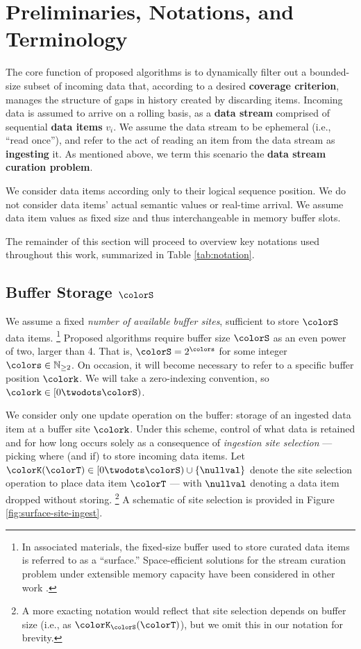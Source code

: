 \section{Preliminaries, Notations, and Terminology} \label{sec:notation}

The core function of proposed algorithms is to dynamically filter out a bounded-size subset of incoming data that, according to a desired \textbf{coverage criterion}, manages the structure of gaps in history created by discarding items.
Incoming data is assumed to arrive on a rolling basis, as a \textbf{data stream} comprised of sequential \textbf{data items} $v_i$.
We assume the data stream to be ephemeral (i.e., ``read once''), and refer to the act of reading an item from the data stream as \textbf{ingesting} it.
As mentioned above, we term this scenario the \textbf{data stream curation problem}.

We consider data items according only to their logical sequence position.
We do not consider data items' actual semantic values or real-time arrival.
We assume data item values as fixed size and thus interchangeable in memory buffer slots.

The remainder of this section will proceed to overview key notations used throughout this work, summarized in Table \ref{tab:notation}.



\subsection{Buffer Storage $\colorS$}
\label{sec:notation-buffer}

We assume a fixed \textit{number of available buffer sites}, sufficient to store $\colorS$ data items.%
\footnote{%
In associated materials, the fixed-size buffer used to store curated data items is referred to as a ``surface.''
Space-efficient solutions for the stream curation problem under extensible memory capacity have been considered in other work \citep{moreno2024algorithms}.%
}
Proposed algorithms require buffer size $\colorS$ as an even power of two, larger than 4. That is, $\colorS = 2^{\colors}$ for some integer $\colors \in \mathbb{N}_{\geq 2}$.
On occasion, it will become necessary to refer to a specific buffer position $\colork$.
We will take a zero-indexing convention, so $\colork \in [0\twodots\colorS)$.

We consider only one update operation on the buffer: storage of an ingested data item at a buffer site $\colork$.
Under this scheme, control of what data is retained and for how long occurs solely as a consequence of \textit{ingestion site selection} --- picking where (and if) to store incoming data items.
Let $\colorK(\colorT) \in [0\twodots\colorS)\cup\{\nullval\}$ denote the site selection operation to place data item $\colorT$ --- with $\nullval$ denoting a data item dropped without storing.%
\footnote{%
A more exacting notation would reflect that site selection depends on buffer size (i.e., as $\colorK_{\colorS}(\colorT)$), but we omit this in our notation for brevity.
}
A schematic of site selection is provided in Figure \ref{fig:surface-site-ingest}.

